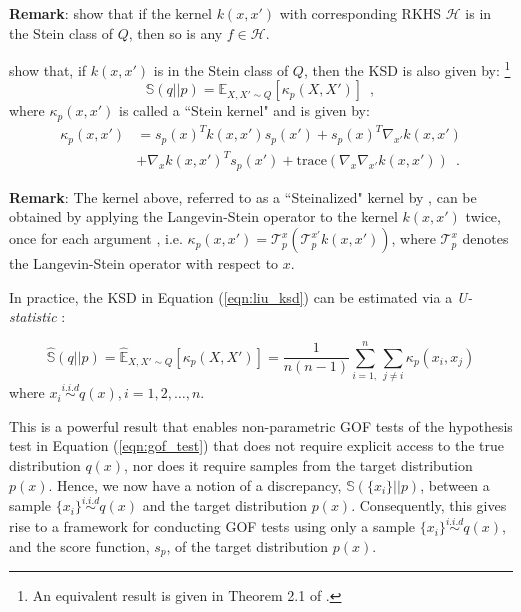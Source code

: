 \textbf{Remark}: \citet[Proposition 3.5]{liu_ksd} show that if the kernel $k(x, x')$ with corresponding RKHS $\mathcal{H}$ is in the Stein class of $Q$, then so is any $f \in \mathcal{H}$.

\citet[Theorem 3.6]{liu_ksd} show that, if $k(x, x')$ is in the Stein class of $Q$, then the KSD is also given by: \footnote{An equivalent result is given in Theorem 2.1 of \citet{chwialkowski_ksd}.}
\renewcommand{\theequation}{2.15}
\begin{equation}
\label{eqn:liu_ksd}
\mathbb{S}(q||p) = \mathbb{E}_{X, X' \sim Q}\left[ \kappa_p(X, X') \right] \enspace,
\end{equation}
where $\kappa_p(x, x')$ is called a ``Stein kernel" \citep{kanagawa_ksd} and is given by:
\begin{align*}
\kappa_p(x,x') &= s_p(x)^T k(x, x') s_p(x') + s_p(x)^T \nabla_{x'}k(x,x') \\ 
&+ \nabla_x k(x, x')^T s_p(x') + \mathrm{trace}\left(\nabla_x \nabla_{x'} k(x, x')\right) \enspace. \tag{2.16}\label{eqn:stein_kernel}
\end{align*}

\textbf{Remark}: The kernel above, referred to as a ``Steinalized" kernel by \citet{liu_svgd_gf}, can be obtained by applying the Langevin-Stein operator to the kernel $k(x, x')$ twice, once for each argument \citep{liu_ksd}, i.e. $\kappa_p(x, x') = \mathcal{T}_p^{x} \left (\mathcal{T}_p^{x'} k(x, x')\right)$, where $\mathcal{T}_p^{x}$ denotes the Langevin-Stein operator with respect to $x$.

In practice, the KSD in Equation (\ref{eqn:liu_ksd}) can be estimated via a \textit{U-statistic} \citep{hoeffding_u_statistics}:

\renewcommand{\theequation}{2.17}
\begin{equation}
\mathbb{\hat{S}}(q||p) = \mathbb{\hat{E}}_{X, X'\sim Q}\left[ \kappa_p(X, X')\right] =\frac{1}{n(n-1)}\sum_{i=1,}^n \sum_{j \not=i} \kappa_p(x_i, x_j)
\end{equation}
where $x_i \overset{i.i.d}{\sim}q(x), i=1,2,\dots, n$. 

This is a powerful result that enables non-parametric GOF tests of the hypothesis test in Equation (\ref{eqn:gof_test}) that does not require explicit access to the true distribution $q(x)$, nor does it require samples from the target distribution $p(x)$. Hence, we now have a notion of a discrepancy, $\mathbb{S}(\{x_i\}||p)$, between a sample $\{x_i\} \overset{i.i.d}{\sim} q(x)$ and the target distribution $p(x)$. Consequently, this gives rise to a framework for conducting GOF tests using only a sample $\{x_i\} \overset{i.i.d}{\sim} q(x)$, and the score function, $s_p$, of the target distribution $p(x)$.


